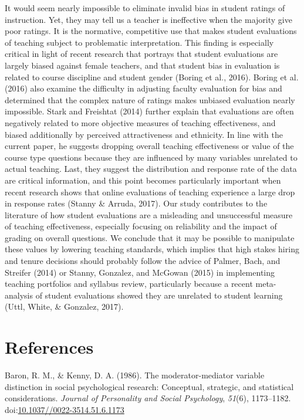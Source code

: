 \documentclass[,man]{apa6}
\theoremstyle{definition}
\theoremstyle{definition}
\theoremstyle{definition}
\theoremstyle{remark}
\begin{document}
It would seem nearly impossible to eliminate invalid bias in student
ratings of instruction. Yet, they may tell us a teacher is ineffective
when the majority give poor ratings. It is the normative, competitive
use that makes student evaluations of teaching subject to problematic
interpretation. This finding is especially critical in light of recent
research that portrays that student evaluations are largely biased
against female teachers, and that student bias in evaluation is related
to course discipline and student gender (Boring et al., 2016). Boring et
al. (2016) also examine the difficulty in adjusting faculty evaluation
for bias and determined that the complex nature of ratings makes
unbiased evaluation nearly impossible. Stark and Freishtat (2014)
further explain that evaluations are often negatively related to more
objective measures of teaching effectiveness, and biased additionally by
perceived attractiveness and ethnicity. In line with the current paper,
he suggests dropping overall teaching effectiveness or value of the
course type questions because they are influenced by many variables
unrelated to actual teaching. Last, they suggest the distribution and
response rate of the data are critical information, and this point
becomes particularly important when recent research shows that online
evaluations of teaching experience a large drop in response rates
(Stanny \& Arruda, 2017). Our study contributes to the literature of how
student evaluations are a misleading and unsuccessful measure of
teaching effectiveness, especially focusing on reliability and the
impact of grading on overall questions. We conclude that it may be
possible to manipulate these values by lowering teaching standards,
which implies that high stakes hiring and tenure decisions should
probably follow the advice of Palmer, Bach, and Streifer (2014) or
Stanny, Gonzalez, and McGowan (2015) in implementing teaching portfolios
and syllabus review, particularly because a recent meta-analysis of
student evaluations showed they are unrelated to student learning (Uttl,
White, \& Gonzalez, 2017).

\newpage

\hypertarget{references}{%
\section{References}\label{references}}

\setlength{\parindent}{-0.5in}
\setlength{\leftskip}{0.5in}

\hypertarget{refs}{}
\leavevmode\hypertarget{ref-Baron1986}{}%
Baron, R. M., \& Kenny, D. A. (1986). The moderator-mediator variable
distinction in social psychological research: Conceptual, strategic, and
statistical considerations. \emph{Journal of Personality and Social
Psychology}, \emph{51}(6), 1173--1182.
doi:\href{https://doi.org/10.1037//0022-3514.51.6.1173}{10.1037//0022-3514.51.6.1173}
\end{document}
